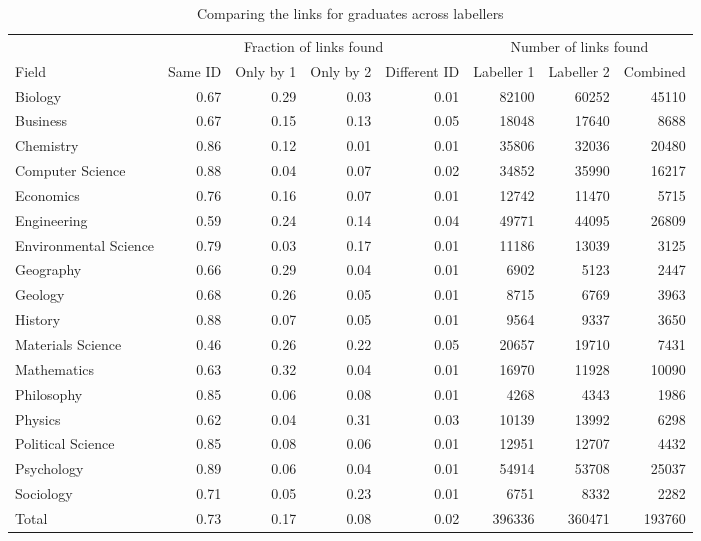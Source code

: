 \begin{table}

\caption{\label{tab:compare_linking_graduates}Comparing the links for graduates across labellers}
\centering
\fontsize{9}{11}\selectfont
\begin{threeparttable}
\begin{tabular}[t]{lrrrrrrr}
\toprule
\multicolumn{1}{c}{ } & \multicolumn{4}{c}{Fraction of links found} & \multicolumn{3}{c}{Number of links found} \\
\cmidrule(l{3pt}r{3pt}){2-5} \cmidrule(l{3pt}r{3pt}){6-8}
Field & Same ID & Only by 1 & Only by 2 & Different ID & Labeller 1 & Labeller 2 & Combined\\
\midrule
Biology & 0.67 & 0.29 & 0.03 & 0.01 & 82100 & 60252 & 45110\\
Business & 0.67 & 0.15 & 0.13 & 0.05 & 18048 & 17640 & 8688\\
Chemistry & 0.86 & 0.12 & 0.01 & 0.01 & 35806 & 32036 & 20480\\
Computer Science & 0.88 & 0.04 & 0.07 & 0.02 & 34852 & 35990 & 16217\\
Economics & 0.76 & 0.16 & 0.07 & 0.01 & 12742 & 11470 & 5715\\
\addlinespace
Engineering & 0.59 & 0.24 & 0.14 & 0.04 & 49771 & 44095 & 26809\\
Environmental Science & 0.79 & 0.03 & 0.17 & 0.01 & 11186 & 13039 & 3125\\
Geography & 0.66 & 0.29 & 0.04 & 0.01 & 6902 & 5123 & 2447\\
Geology & 0.68 & 0.26 & 0.05 & 0.01 & 8715 & 6769 & 3963\\
History & 0.88 & 0.07 & 0.05 & 0.01 & 9564 & 9337 & 3650\\
\addlinespace
Materials Science & 0.46 & 0.26 & 0.22 & 0.05 & 20657 & 19710 & 7431\\
Mathematics & 0.63 & 0.32 & 0.04 & 0.01 & 16970 & 11928 & 10090\\
Philosophy & 0.85 & 0.06 & 0.08 & 0.01 & 4268 & 4343 & 1986\\
Physics & 0.62 & 0.04 & 0.31 & 0.03 & 10139 & 13992 & 6298\\
Political Science & 0.85 & 0.08 & 0.06 & 0.01 & 12951 & 12707 & 4432\\
\addlinespace
Psychology & 0.89 & 0.06 & 0.04 & 0.01 & 54914 & 53708 & 25037\\
Sociology & 0.71 & 0.05 & 0.23 & 0.01 & 6751 & 8332 & 2282\\
\midrule
Total & 0.73 & 0.17 & 0.08 & 0.02 & 396336 & 360471 & 193760\\

\end{tabular}
\end{threeparttable}
\end{table}
